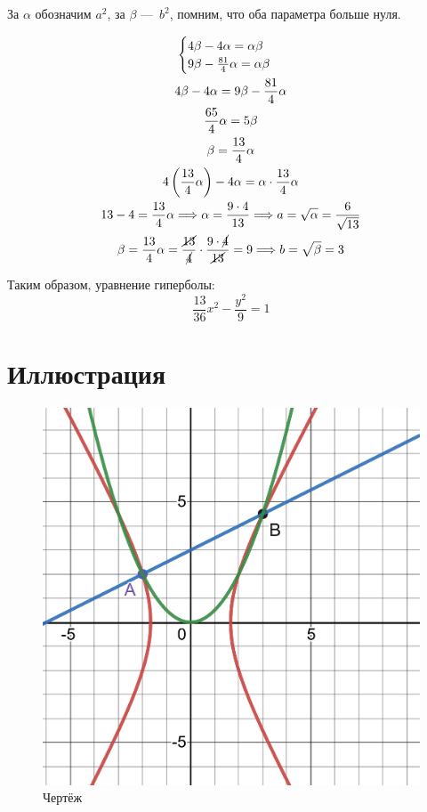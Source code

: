 \documentclass[12pt, a4paper]{article}
\begin{document}
    За $\alpha$ обозначим $a^2$, за $\beta$ — $b^2$, помним, что оба параметра больше нуля.

    \begin{gather}
        \begin{cases}
            4\beta - 4\alpha = \alpha\beta \\
            9\beta - \frac{81}{4} \alpha = \alpha\beta
        \end{cases} \\
        4\beta - 4\alpha = 9\beta - \frac{81}{4} \alpha \\
        \frac{65}{4}\alpha = 5\beta \\
        \beta = \frac{13}{4}\alpha \\
        4 \left( \frac{13}{4}\alpha \right) - 4\alpha = \alpha \cdot \frac{13}{4}\alpha \\
        13 - 4 = \frac{13}{4}\alpha \Longrightarrow \alpha = \frac{9 \cdot 4}{13} \Longrightarrow a = \sqrt{\alpha} = \frac{6}{\sqrt{13}} \\
        \beta = \frac{13}{4}\alpha = \frac{\cancel{13}}{\cancel{4}} \cdot \frac{9 \cdot \cancel{4}}{\cancel{13}} = 9 \Longrightarrow b = \sqrt{\beta} = 3
    \end{gather}

    Таким образом, уравнение гиперболы:
    \begin{equation}
        \frac{13}{36} x^2 - \frac{y^2}{9} = 1
    \end{equation}


    \section{Иллюстрация}

    \begin{figure}[h!]
        \centering
        \includegraphics[width=\textwidth]{resources/1.6_figure.pdf}
        \caption{Чертёж}
        \label{fig:main_figure}
    \end{figure}
    \FloatBarrier
\end{document}
